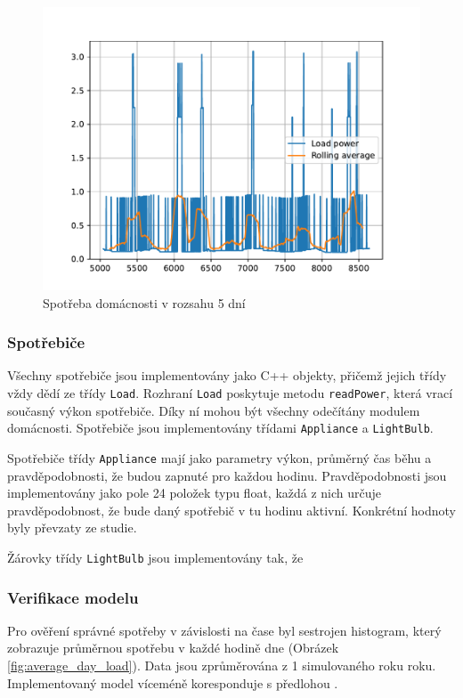 \documentclass[12pt,a4paper]{article}
\begin{document}
\begin{figure}
\includegraphics[width=\linewidth]{img/load_power.pdf}
\caption{Spotřeba domácnosti v rozsahu 5 dní}
\label{fig:load_power}
\end{figure}

\subsubsection{Spotřebiče}
Všechny spotřebiče jsou implementovány jako C++ objekty, přičemž jejich třídy vždy dědí ze třídy \texttt{Load}.
Rozhraní \texttt{Load} poskytuje metodu \texttt{readPower}, která vrací současný výkon spotřebiče.
Díky ní mohou být všechny odečítány modulem domácnosti.
Spotřebiče jsou implementovány třídami \texttt{Appliance} a \texttt{LightBulb}.

Spotřebiče třídy \texttt{Appliance} mají jako parametry výkon, průměrný čas běhu a pravděpodobnosti, že budou zapnuté pro každou hodinu.
Pravděpodobnosti jsou implementovány jako pole 24 položek typu float,
každá z nich určuje pravděpodobnost, že bude daný spotřebič v tu hodinu aktivní.
Konkrétní hodnoty byly převzaty ze studie. \cite{TORRITI201737}

Žárovky třídy \texttt{LightBulb} jsou implementovány tak,
že


\subsubsection{Verifikace modelu}

Pro ověření správné spotřeby v závislosti na čase byl sestrojen histogram,
který zobrazuje průměrnou spotřebu v každé hodině dne (Obrázek \ref{fig:average_day_load}).
Data jsou zprůměrována z 1 simulovaného roku roku.
Implementovaný model víceméně koresponduje s předlohou \cite{TORRITI201737}.
\end{document}
